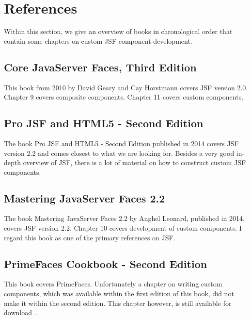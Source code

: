 %

\chapter*{References}
\label{chap:references}
Within this section, we give an overview of books in chronological order that contain some chapters on custom JSF component development.


\section*{Core JavaServer Faces, Third Edition}
This book \cite{geary2010core} from 2010 by David Geary and Cay Horstmann covers JSF version 2.0.
Chapter 9 covers composite components.
Chapter 11 covers custom components.


\section*{Pro JSF and HTML5 - Second Edition}
The book Pro JSF and HTML5 - Second Edition \cite{wadia2014pro} published in 2014 covers JSF version 2.2 and comes closest to what we are looking for.
Besides a very good in-depth overview of JSF, there is a lot of material on how to construct custom JSF components.


\section*{Mastering JavaServer Faces 2.2}
The book Mastering JavaServer Faces 2.2 \cite{leonard2014mastering} by Anghel Leonard, published in 2014, covers JSF version 2.2.
Chapter 10 covers development of custom components.
I regard this book as one of the primary references on JSF.
 
 
 \section*{PrimeFaces Cookbook - Second Edition}
 This book \cite{10.5555/2834507} covers PrimeFaces.
 Unfortunately a chapter on writing custom components, which was available within the first edition of this book, did not make it within the second edition.
 This chapter however, is still available for download \cite{PrimeFacesCookbookChapter11}.


